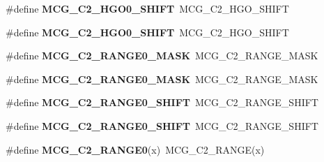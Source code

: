 \begin{DoxyCompactItemize}
\item 
\#define {\bfseries M\+C\+G\+\_\+\+C2\+\_\+\+H\+G\+O0\+\_\+\+S\+H\+I\+FT}~M\+C\+G\+\_\+\+C2\+\_\+\+H\+G\+O\+\_\+\+S\+H\+I\+FT\hypertarget{group__Backward__Compatibility__Symbols_ga881979b382aef0029c4e4990e365d8f5}{}\label{group__Backward__Compatibility__Symbols_ga881979b382aef0029c4e4990e365d8f5}

\item 
\#define {\bfseries M\+C\+G\+\_\+\+C2\+\_\+\+H\+G\+O0\+\_\+\+S\+H\+I\+FT}~M\+C\+G\+\_\+\+C2\+\_\+\+H\+G\+O\+\_\+\+S\+H\+I\+FT\hypertarget{group__Backward__Compatibility__Symbols_ga881979b382aef0029c4e4990e365d8f5}{}\label{group__Backward__Compatibility__Symbols_ga881979b382aef0029c4e4990e365d8f5}

\item 
\#define {\bfseries M\+C\+G\+\_\+\+C2\+\_\+\+R\+A\+N\+G\+E0\+\_\+\+M\+A\+SK}~M\+C\+G\+\_\+\+C2\+\_\+\+R\+A\+N\+G\+E\+\_\+\+M\+A\+SK\hypertarget{group__Backward__Compatibility__Symbols_ga5436f4e93034d8536c23eabcac1b1a43}{}\label{group__Backward__Compatibility__Symbols_ga5436f4e93034d8536c23eabcac1b1a43}

\item 
\#define {\bfseries M\+C\+G\+\_\+\+C2\+\_\+\+R\+A\+N\+G\+E0\+\_\+\+M\+A\+SK}~M\+C\+G\+\_\+\+C2\+\_\+\+R\+A\+N\+G\+E\+\_\+\+M\+A\+SK\hypertarget{group__Backward__Compatibility__Symbols_ga5436f4e93034d8536c23eabcac1b1a43}{}\label{group__Backward__Compatibility__Symbols_ga5436f4e93034d8536c23eabcac1b1a43}

\item 
\#define {\bfseries M\+C\+G\+\_\+\+C2\+\_\+\+R\+A\+N\+G\+E0\+\_\+\+S\+H\+I\+FT}~M\+C\+G\+\_\+\+C2\+\_\+\+R\+A\+N\+G\+E\+\_\+\+S\+H\+I\+FT\hypertarget{group__Backward__Compatibility__Symbols_gaca9dfaea66978e556c7a9773e2c8c531}{}\label{group__Backward__Compatibility__Symbols_gaca9dfaea66978e556c7a9773e2c8c531}

\item 
\#define {\bfseries M\+C\+G\+\_\+\+C2\+\_\+\+R\+A\+N\+G\+E0\+\_\+\+S\+H\+I\+FT}~M\+C\+G\+\_\+\+C2\+\_\+\+R\+A\+N\+G\+E\+\_\+\+S\+H\+I\+FT\hypertarget{group__Backward__Compatibility__Symbols_gaca9dfaea66978e556c7a9773e2c8c531}{}\label{group__Backward__Compatibility__Symbols_gaca9dfaea66978e556c7a9773e2c8c531}

\item 
\#define {\bfseries M\+C\+G\+\_\+\+C2\+\_\+\+R\+A\+N\+G\+E0}(x)~M\+C\+G\+\_\+\+C2\+\_\+\+R\+A\+N\+GE(x)\hypertarget{group__Backward__Compatibility__Symbols_ga4717ad2318b6cbc4586d554b59d0382e}{}\label{group__Backward__Compatibility__Symbols_ga4717ad2318b6cbc4586d554b59d0382e}


\end{DoxyCompactItemize}
